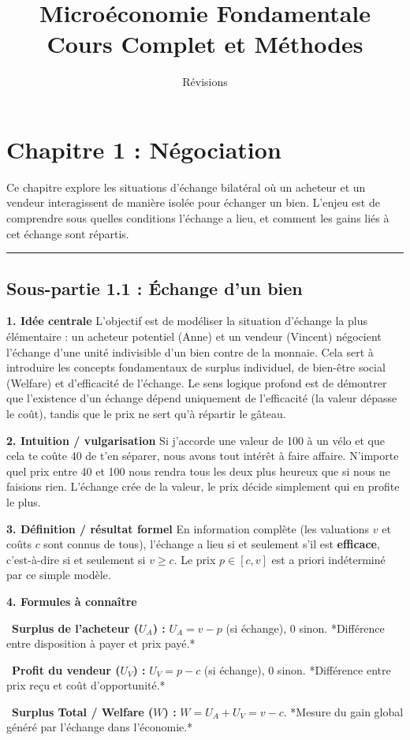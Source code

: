 \documentclass[11pt, a4paper]{report}
\title{\Huge \textbf{Microéconomie Fondamentale} \\ \vspace{0.5cm} \Large Cours Complet et Méthodes}
\author{Révisions}
\date{}
\begin{document}
\maketitle
\tableofcontents
\newpage

\chapter{Chapitre 1 : Négociation}

Ce chapitre explore les situations d'échange bilatéral où un acheteur et un vendeur interagissent de manière isolée pour échanger un bien. L'enjeu est de comprendre sous quelles conditions l'échange a lieu, et comment les gains liés à cet échange sont répartis.

\vspace{1cm}\hrule\vspace{1cm}

\section{Sous-partie 1.1 : Échange d'un bien}

\textbf{1. Idée centrale}
L'objectif est de modéliser la situation d'échange la plus élémentaire : un acheteur potentiel (Anne) et un vendeur (Vincent) négocient l'échange d'une unité indivisible d'un bien contre de la monnaie. Cela sert à introduire les concepts fondamentaux de surplus individuel, de bien-être social (Welfare) et d'efficacité de l'échange. Le sens logique profond est de démontrer que l'existence d'un échange dépend uniquement de l'efficacité (la valeur dépasse le coût), tandis que le prix ne sert qu'à répartir le gâteau.

\textbf{2. Intuition / vulgarisation}
Si j'accorde une valeur de 100\texteuro{} à un vélo et que cela te coûte 40\texteuro{} de t'en séparer, nous avons tout intérêt à faire affaire. N'importe quel prix entre 40\texteuro{} et 100\texteuro{} nous rendra tous les deux plus heureux que si nous ne faisions rien. L'échange crée de la valeur, le prix décide simplement qui en profite le plus.

\textbf{3. Définition / résultat formel}
En information complète (les valuations $v$ et coûts $c$ sont connus de tous), l'échange a lieu si et seulement s'il est \textbf{efficace}, c'est-à-dire si et seulement si $v \ge c$. Le prix $p \in [c, v]$ est a priori indéterminé par ce simple modèle. 

\textbf{4. Formules à connaître}
\par \textbullet\ \textbf{Surplus de l'acheteur ($U_A$) :} $U_A = v - p$ (si échange), 0 sinon. *Différence entre disposition à payer et prix payé.*
\par \textbullet\ \textbf{Profit du vendeur ($U_V$) :} $U_V = p - c$ (si échange), 0 sinon. *Différence entre prix reçu et coût d'opportunité.*
\par \textbullet\ \textbf{Surplus Total / Welfare ($W$) :} $W = U_A + U_V = v - c$. *Mesure du gain global généré par l'échange dans l'économie.*
\end{document}
